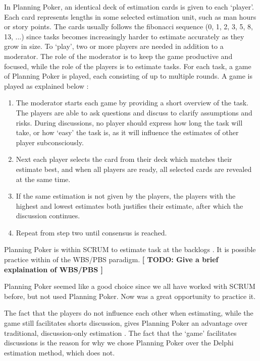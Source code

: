 In Planning Poker, an identical deck of estimation cards is given to each `player'. Each card represents lengths in some selected estimation unit, such as man hours or story points. The cards usually follows the fibonacci sequence (0, 1, 2, 3, 5, 8, 13, ...) since tasks becomes increasingly harder to estimate accurately as they grow in size.
To `play', two or more players are needed in addition to a moderator. The role of the moderator is to keep the game productive and focused, while the role of the players is to estimate tasks.
For each task, a game of Planning Poker is played, each consisting of up to multiple rounds. A game is played as explained below \textbf{\cite[p. ?]{?}}:
\begin{enumerate}
	\item The moderator starts each game by providing a short overview of the task. The players are able to ask questions and discuss to clarify assumptions and risks. During discussions, no player should express how long the task will take, or how `easy' the task is, as it will influence the estimates of other player subconsciously.
	\item Next each player selects the card from their deck which matches their estimate best, and when all players are ready, all selected cards are revealed at the same time.
	\item If the same estimation is not given by the players, the players with the highest and lowest estimates both justifies their estimate, after which the discussion continues.
	\item Repeat from step two until consensus is reached.
\end{enumerate}

Planning Poker is within SCRUM to estimate task at the backlogs \textbf{\cite[p. ?]{?}}. It is possible practice within of the WBS/PBS paradigm. \textbf{[ TODO: Give a brief explaination of WBS/PBS ]}

Planning Poker seemed like a good choice since we all have worked with SCRUM before, but not used Planning Poker. Now was a great opportunity to practice it.

The fact that the players do not influence each other when estimating, while the game still facilitates shorts discussion, gives Planning Poker an advantage over traditional, discussion-only estimation \textbf{\cite[p. ?]{?}}. 
The fact that the `game' facilitates discussions is the reason for why we chose Planning Poker over the Delphi estimation method, which does not.

